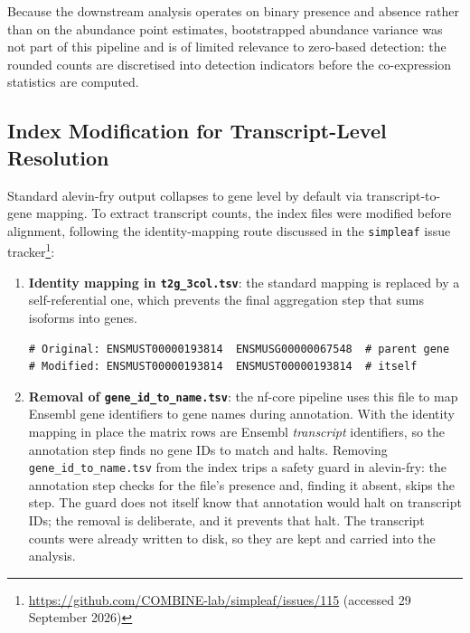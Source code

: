 Because the downstream analysis operates on binary presence and absence rather than on the abundance point estimates, bootstrapped abundance variance was not part of this pipeline and is of limited relevance to zero-based detection: the rounded counts are discretised into detection indicators before the co-expression statistics are computed.

\subsection*{Index Modification for Transcript-Level Resolution}\label{sec:modification-process}

Standard alevin-fry\cite{he2022alevin} output collapses to gene level by default via transcript-to-gene mapping. To extract transcript counts, the index files were modified before alignment, following the identity-mapping route discussed in the \texttt{simpleaf} issue tracker\footnote{\url{https://github.com/COMBINE-lab/simpleaf/issues/115} (accessed 29 September 2026)}:

\begin{enumerate}
    \item \textbf{Identity mapping in \texttt{t2g\_3col.tsv}}: the standard mapping is replaced by a self-referential one, which prevents the final aggregation step that sums isoforms into genes.
{\small\begin{verbatim}
# Original: ENSMUST00000193814  ENSMUSG00000067548  # parent gene
# Modified: ENSMUST00000193814  ENSMUST00000193814  # itself
\end{verbatim}}

    \item \textbf{Removal of \texttt{gene\_id\_to\_name.tsv}}: the nf-core pipeline uses this file to map Ensembl gene identifiers to gene names during annotation. With the identity mapping in place the matrix rows are Ensembl \emph{transcript} identifiers, so the annotation step finds no gene IDs to match and halts. Removing \texttt{gene\_id\_to\_name.tsv} from the index trips a safety guard in alevin-fry: the annotation step checks for the file's presence and, finding it absent, skips the step. The guard does not itself know that annotation would halt on transcript IDs; the removal is deliberate, and it prevents that halt. The transcript counts were already written to disk, so they are kept and carried into the analysis.
\end{enumerate}

